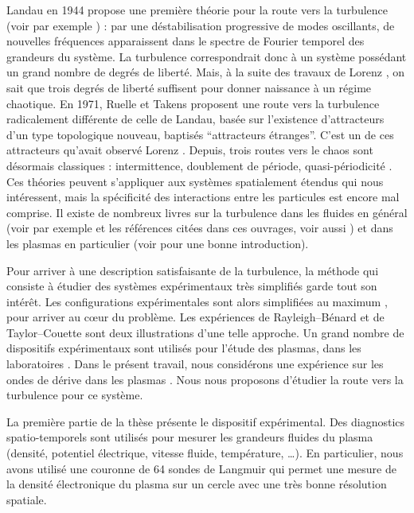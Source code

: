 \documentclass{book}
\begin{document}
Landau en 1944 propose une premi\`ere th\'eorie pour la route vers la
turbulence (voir par exemple \cite{LandauFlu,Berge84}) : par une
d\'estabilisation 
progressive de modes oscillants, de nouvelles fr\'equences
apparaissent dans le spectre de Fourier temporel des grandeurs du
syst\`eme. La turbulence correspondrait donc \`a un syst\`eme
poss\'edant un grand nombre de degr\'es de libert\'e.
Mais, \`a la suite des travaux de Lorenz \cite{Lorenz63}, on sait que
trois degr\'es de libert\'e suffisent pour donner naissance \`a un
r\'egime chaotique. En 1971, Ruelle et Takens \cite{Ruelle71}
proposent une route 
vers la turbulence radicalement diff\'erente de celle de Landau,
bas\'ee sur l'existence d'attracteurs d'un type topologique nouveau,
baptis\'es ``attracteurs \'etranges''. C'est un de ces attracteurs
qu'avait observ\'e Lorenz \cite{Lorenz63}.
Depuis, trois routes vers le chaos sont d\'esormais classiques :
intermittence, 
doublement de p\'eriode,
quasi-p\'eriodicit\'e  
\cite{Jensen83a,Bishop86a,Stavans85}. 
Ces th\'eories peuvent s'appliquer aux syst\`emes spatialement
\'etendus qui 
nous int\'eressent, mais la sp\'ecificit\'e des interactions entre les
particules est encore mal comprise.
Il existe de nombreux livres sur la turbulence dans les fluides en
g\'en\'eral (voir par exemple
\cite{Manneville91,Lesieur90,Stanisic85} et les r\'ef\'erences
cit\'ees dans ces 
ouvrages, voir aussi \cite{Eckmann81})  et dans les plasmas en
particulier (voir
\cite{Galeev83} pour une bonne introduction). 

Pour arriver \`a une description satisfaisante de la turbulence, la
m\'ethode qui consiste \`a \'etudier des syst\`emes exp\'erimentaux tr\`es
simplifi\'es garde tout son int\'er\^et. Les configurations
exp\'erimentales sont alors simplifi\'ees au maximum
\cite{Kadanoff91}, pour arriver au c\oe ur du probl\`eme. Les
exp\'eriences de Rayleigh--B\'enard \cite{Berge84} et de
Taylor--Couette \cite{Craik71} sont deux illustrations d'une telle
approche.
Un grand nombre de dispositifs exp\'erimentaux sont utilis\'es pour
l'\'etude des plasmas, dans les laboratoires \cite{Chen84}.
Dans le pr\'esent travail, nous consid\'erons une exp\'erience
\cite{Latten95} sur les
ondes de d\'erive dans les plasmas
\cite{Chen64,Chen65,Horton90,Horton84}. 
Nous nous proposons d'\'etudier la route vers la turbulence pour ce
syst\`eme. 


La premi\`ere partie de la th\`ese pr\'esente le dispositif
exp\'erimental. 
Des diagnostics spatio-temporels sont utilis\'es pour mesurer les
grandeurs fluides du plasma (densit\'e, potentiel \'electrique, vitesse
fluide, temp\'erature, \dots). En particulier, nous avons utilis\'e une
couronne de 64 sondes de Langmuir qui permet une mesure de la
densit\'e \'electronique du plasma sur un cercle avec une tr\`es bonne
r\'esolution spatiale.
\end{document}
